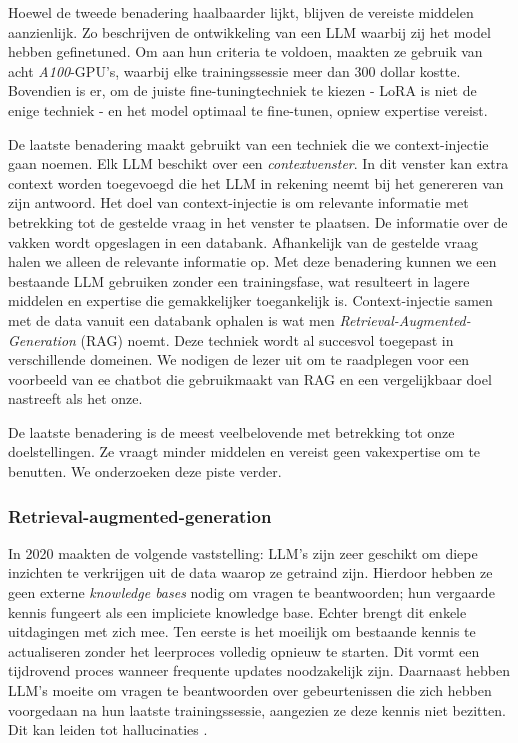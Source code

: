 Hoewel de tweede benadering haalbaarder lijkt, blijven de vereiste middelen aanzienlijk. Zo beschrijven \textcite{Chiang2023} de ontwikkeling van een LLM waarbij zij het model hebben gefinetuned. Om aan hun criteria te voldoen, maakten ze gebruik van acht \textit{A100}-GPU's, waarbij elke trainingssessie meer dan 300 dollar kostte. Bovendien is er, om de juiste fine-tuningtechniek te kiezen - LoRA is niet de enige techniek - en het model optimaal te fine-tunen, opniew expertise vereist.

De laatste benadering maakt gebruikt van een techniek die we context-injectie gaan noemen. Elk LLM beschikt over een \textit{contextvenster}. In dit venster kan extra context worden toegevoegd die het LLM in rekening neemt bij het genereren van zijn antwoord. Het doel van context-injectie is om relevante informatie met betrekking tot de gestelde vraag in het venster te plaatsen. De informatie over de vakken wordt opgeslagen in een databank. Afhankelijk van de gestelde vraag halen we alleen de relevante informatie op. Met deze benadering kunnen we een bestaande LLM gebruiken zonder een trainingsfase, wat resulteert in lagere middelen en expertise die gemakkelijker toegankelijk is. Context-injectie samen met de data vanuit een databank ophalen is wat men \textit{Retrieval-Augmented-Generation} (RAG) noemt. Deze techniek wordt al succesvol toegepast in verschillende domeinen. We nodigen de lezer uit om \textcite{Wang2024} te raadplegen voor een voorbeeld van ee chatbot die gebruikmaakt van RAG en een vergelijkbaar doel nastreeft als het onze. 

De laatste benadering is de meest veelbelovende met betrekking tot onze doelstellingen. Ze vraagt minder middelen en vereist geen vakexpertise om te benutten. We onderzoeken deze piste verder.

\subsubsection{Retrieval-augmented-generation}

In 2020 maakten \textcite{Lewis2020} de volgende vaststelling: LLM's zijn zeer geschikt om diepe inzichten te verkrijgen uit de data waarop ze getraind zijn. Hierdoor hebben ze geen externe \textit{knowledge bases} nodig om vragen te beantwoorden; hun vergaarde kennis fungeert als een impliciete knowledge base. Echter brengt dit enkele uitdagingen met zich mee. Ten eerste is het moeilijk om bestaande kennis te actualiseren zonder het leerproces volledig opnieuw te starten. Dit vormt een tijdrovend proces wanneer frequente updates noodzakelijk zijn. Daarnaast hebben LLM's moeite om vragen te beantwoorden over gebeurtenissen die zich hebben voorgedaan na hun laatste trainingssessie, aangezien ze deze kennis niet bezitten. Dit kan leiden tot hallucinaties \autocite{Gao2023}.

